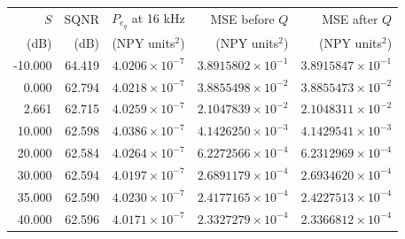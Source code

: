 \begin{tabular}{rrrrr}
\toprule
$S$ & SQNR & $P_{e_q}$ at 16 kHz & MSE before $Q$ & MSE after $Q$ \\
(dB) & (dB) & (NPY units$^2$) & (NPY units$^2$) & (NPY units$^2$) \\
\midrule
-10.000 & 64.419 & $4.0206\times10^{-7}$ & $3.8915802\times10^{-1}$ & $3.8915847\times10^{-1}$ \\
0.000 & 62.794 & $4.0218\times10^{-7}$ & $3.8855498\times10^{-2}$ & $3.8855473\times10^{-2}$ \\
2.661 & 62.715 & $4.0259\times10^{-7}$ & $2.1047839\times10^{-2}$ & $2.1048311\times10^{-2}$ \\
10.000 & 62.598 & $4.0386\times10^{-7}$ & $4.1426250\times10^{-3}$ & $4.1429541\times10^{-3}$ \\
20.000 & 62.584 & $4.0264\times10^{-7}$ & $6.2272566\times10^{-4}$ & $6.2312969\times10^{-4}$ \\
30.000 & 62.594 & $4.0197\times10^{-7}$ & $2.6891179\times10^{-4}$ & $2.6934620\times10^{-4}$ \\
35.000 & 62.590 & $4.0230\times10^{-7}$ & $2.4177165\times10^{-4}$ & $2.4227513\times10^{-4}$ \\
40.000 & 62.596 & $4.0171\times10^{-7}$ & $2.3327279\times10^{-4}$ & $2.3366812\times10^{-4}$ \\
\bottomrule
\end{tabular}
